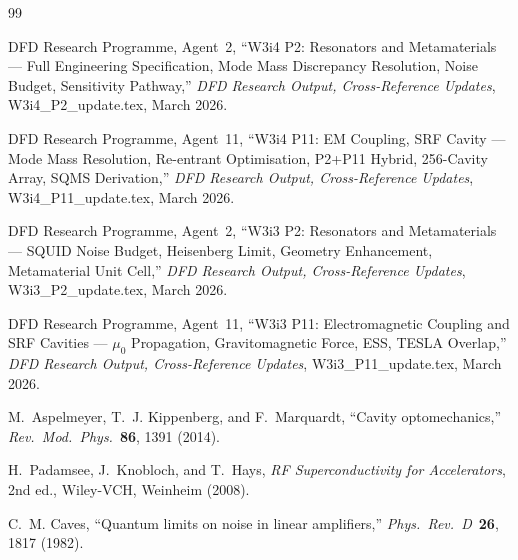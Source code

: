 \documentclass[11pt,twocolumn]{article}
\theoremstyle{definition}
\theoremstyle{remark}
\begin{document}
\begin{thebibliography}{99}

DFD Research Programme, Agent~2,
``W3i4 P2: Resonators and Metamaterials --- Full Engineering Specification,
Mode Mass Discrepancy Resolution, Noise Budget, Sensitivity Pathway,''
\textit{DFD Research Output, Cross-Reference Updates},
W3i4\_P2\_update.tex, March 2026.

DFD Research Programme, Agent~11,
``W3i4 P11: EM Coupling, SRF Cavity --- Mode Mass Resolution,
Re-entrant Optimisation, P2+P11 Hybrid, 256-Cavity Array, SQMS Derivation,''
\textit{DFD Research Output, Cross-Reference Updates},
W3i4\_P11\_update.tex, March 2026.

DFD Research Programme, Agent~2,
``W3i3 P2: Resonators and Metamaterials --- SQUID Noise Budget,
Heisenberg Limit, Geometry Enhancement, Metamaterial Unit Cell,''
\textit{DFD Research Output, Cross-Reference Updates},
W3i3\_P2\_update.tex, March 2026.

DFD Research Programme, Agent~11,
``W3i3 P11: Electromagnetic Coupling and SRF Cavities ---
$\mu_0$ Propagation, Gravitomagnetic Force, ESS, TESLA Overlap,''
\textit{DFD Research Output, Cross-Reference Updates},
W3i3\_P11\_update.tex, March 2026.

M.~Aspelmeyer, T.~J. Kippenberg, and F.~Marquardt,
``Cavity optomechanics,''
\textit{Rev.\ Mod.\ Phys.}\ \textbf{86}, 1391 (2014).

H.~Padamsee, J.~Knobloch, and T.~Hays,
\textit{RF Superconductivity for Accelerators},
2nd ed., Wiley-VCH, Weinheim (2008).

C.~M. Caves,
``Quantum limits on noise in linear amplifiers,''
\textit{Phys.\ Rev.\ D}\ \textbf{26}, 1817 (1982).

\end{thebibliography}
\end{document}
